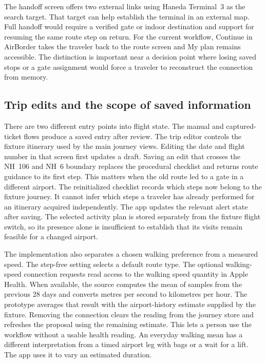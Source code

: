 \documentclass[sigconf,nonacm,balance=false]{acmart}
\begin{document}
The handoff screen offers two external links using Haneda Terminal~3 as the search target. That target can help establish the terminal in an external map. Full handoff would require a verified gate or indoor destination and support for resuming the same route step on return. For the current workflow, Continue in AirBorder takes the traveler back to the route screen and My plan remains accessible. The distinction is important near a decision point where losing saved stops or a gate assignment would force a traveler to reconstruct the connection from memory.

\subsection{Trip edits and the scope of saved information}
There are two different entry points into flight state. The manual and captured-ticket flows produce a saved entry after review. The trip editor controls the fixture itinerary used by the main journey views. Editing the date and flight number in that screen first updates a draft. Saving an edit that crosses the NH~106 and NH~6 boundary replaces the procedural checklist and returns route guidance to its first step. This matters when the old route led to a gate in a different airport. The reinitialized checklist records which steps now belong to the fixture journey. It cannot infer which steps a traveler has already performed for an itinerary acquired independently. The app updates the relevant alert state after saving. The selected activity plan is stored separately from the fixture flight switch, so its presence alone is insufficient to establish that its visits remain feasible for a changed airport.

The implementation also separates a chosen walking preference from a measured speed. The step-free setting selects a default route type. The optional walking-speed connection requests read access to the walking speed quantity in Apple Health. When available, the source computes the mean of samples from the previous 28 days and converts metres per second to kilometres per hour. The prototype averages that result with the airport-history estimate supplied by the fixture. Removing the connection clears the reading from the journey store and refreshes the proposal using the remaining estimate. This lets a person use the workflow without a usable health reading. An everyday walking mean has a different interpretation from a timed airport leg with bags or a wait for a lift. The app uses it to vary an estimated duration.
\end{document}
